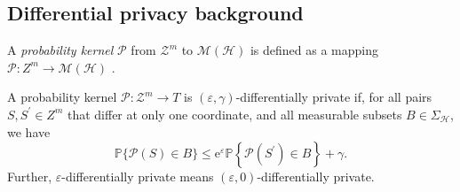 \begin{noaddcontents}
\subsection{Differential privacy background}
\label{sec: back_dp}
\begin{definition}
A \emph{probability kernel} $\mathcal{P}$ from $\mathcal{Z}^m$ to $\mathcal{M}(\mathcal{H})$ is defined as a mapping $\mathcal{P}: {Z}^m \rightarrow \mathcal{M}(\mathcal{H})$ .
\end{definition}

\begin{definition}
A probability kernel $\mathcal{P}: \mathcal{Z}^m \rightarrow T$ is $(\varepsilon, \gamma)$-differentially private if, for all pairs $S, S^{\prime} \in Z^m$ that differ at only one coordinate, and all measurable subsets $B \in \Sigma_{\mathcal{H}}$, we have $$\mathbb{P}\{\mathcal{P}(S) \in B\} \leq \mathrm{e}^{\varepsilon} \mathbb{P}\left\{\mathcal{P}\left(S^{\prime}\right) \in B\right\}+\gamma.$$
Further, $\varepsilon$-differentially private means $(\varepsilon, 0)$-differentially private.
\end{definition}


\end{noaddcontents}

